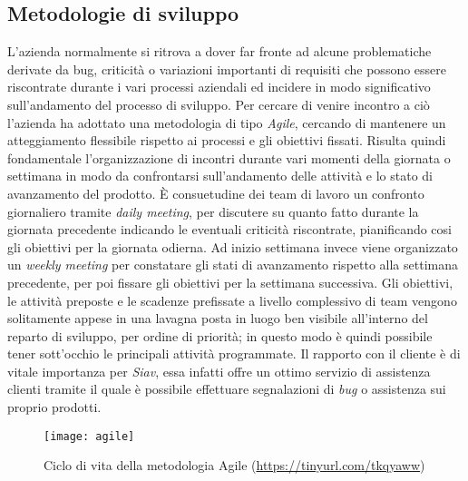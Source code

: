 \subsection{Metodologie di sviluppo}
L'azienda normalmente si ritrova a dover far fronte ad alcune problematiche derivate da bug, criticità o variazioni importanti di requisiti che possono essere riscontrate durante i vari processi aziendali ed incidere in modo significativo sull'andamento del processo di sviluppo.
Per cercare di venire incontro a ciò l'azienda ha adottato una metodologia di tipo \textit{Agile}, cercando di mantenere un atteggiamento flessibile rispetto ai processi e gli obiettivi fissati. Risulta quindi fondamentale l'organizzazione di incontri durante vari momenti della giornata o settimana in modo da confrontarsi sull'andamento delle attività e lo stato di avanzamento del prodotto. È consuetudine dei team di lavoro un confronto giornaliero tramite \textit{daily meeting}, per discutere su quanto fatto durante la giornata precedente indicando le eventuali criticità riscontrate, pianificando cosi gli obiettivi per la giornata odierna. Ad inizio settimana invece viene organizzato un \textit{weekly meeting} per constatare gli stati di avanzamento rispetto alla settimana precedente, per poi fissare gli obiettivi per la settimana successiva. Gli obiettivi, le attività preposte e le scadenze prefissate a livello complessivo di team vengono solitamente appese in una lavagna posta in luogo ben visibile all'interno del reparto di sviluppo, per ordine di priorità; in questo modo è quindi possibile tener sott'occhio le principali attività programmate. Il rapporto con il cliente è di vitale importanza per \textit{Siav}, essa infatti offre un ottimo servizio di assistenza clienti tramite il quale è possibile effettuare segnalazioni di \textit{bug} o assistenza sui proprio prodotti. 
\begin{figure}[!h] 
	\centering 
	\texttt{[image: agile]} 
	\caption{Ciclo di vita della metodologia Agile (\url{https://tinyurl.com/tkqyaww})}
\end{figure}
